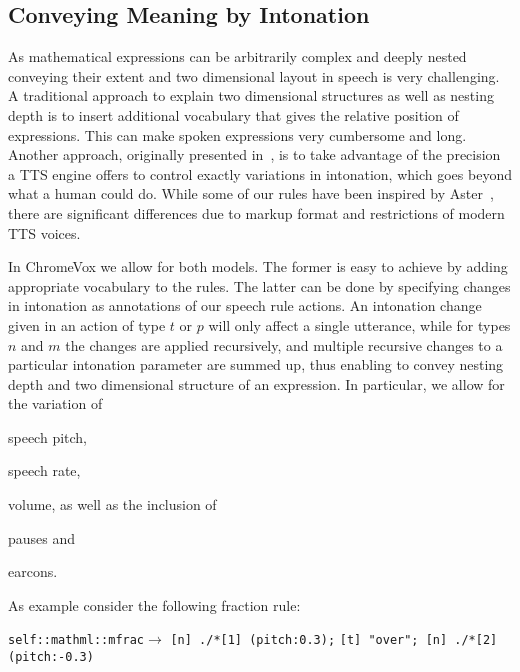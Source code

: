 \documentclass{sig-alternate}
\begin{document}



\subsection{Conveying Meaning by Intonation}

As mathematical expressions can be arbitrarily complex and deeply nested
conveying their extent and two dimensional layout in speech is very challenging.
A traditional approach to explain two dimensional structures as well as nesting
depth is to insert additional vocabulary that gives the relative position of
expressions. This can make spoken expressions very cumbersome and long.
Another approach, originally presented in~\cite{raman1994aster}, is to take
advantage of the precision a TTS engine offers to control exactly variations in
intonation, which goes beyond what a human could do.  While some of our rules
have been inspired by Aster~\cite{raman1994aster}, there are significant
differences due to markup format and restrictions of modern TTS voices.


In ChromeVox we allow for both models. The former is easy to achieve by adding
appropriate vocabulary to the rules. The latter can be done by specifying
changes in intonation as annotations of our speech rule actions. An intonation
change given in an action of type $t$ or $p$ will only affect a single
utterance, while for types $n$ and $m$ the changes are applied recursively,
and multiple recursive changes to a particular intonation parameter are summed
up, thus enabling to convey nesting depth and two dimensional structure of an
expression.  In particular, we allow for the variation of
\begin{inparaenum}[(1)]
\item speech pitch,
\item speech rate,
\item volume, as well as the inclusion of
\item pauses and
\item earcons.
\end{inparaenum}

As example consider the following fraction rule:

\noindent\texttt{self::mathml::mfrac}$\longrightarrow$
\texttt{[n] ./*[1] (pitch:0.3);}\newline
\hspace*{\fill}\texttt{[t] "over"; [n] ./*[2] (pitch:-0.3)}
\end{document}
